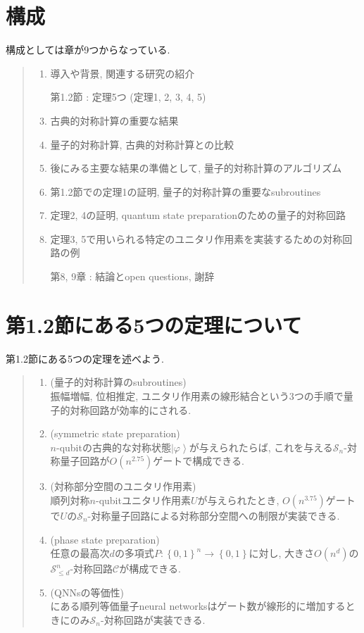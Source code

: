 \documentclass[12pt]{jsarticle}
\begin{document}
\section*{構成}
構成としては章が9つからなっている. 
\renewcommand{\theenumi}{\arabic{enumi}}
\renewcommand{\labelenumi}{第{\theenumi}章 :}
\begin{quote}
    \begin{enumerate}
        \item 導入や背景, 関連する研究の紹介
        \item[第1.2節 :] 定理5つ (定理1, 2, 3, 4, 5)
        \item 古典的対称計算の重要な結果
        \item 量子的対称計算, 古典的対称計算との比較
        \item 後にみる主要な結果の準備として, 量子的対称計算のアルゴリズム
        \item 第1.2節での定理1の証明, 量子的対称計算の重要なsubroutines
        \item 定理2, 4の証明, quantum state preparationのための量子的対称回路
        \item 定理3, 5で用いられる特定のユニタリ作用素を実装するための対称回路の例
        \item[第8, 9章 :] 結論とopen questions, 謝辞
    \end{enumerate}
\end{quote}
\section*{第1.2節にある5つの定理について}
第1.2節にある5つの定理を述べよう. 
\renewcommand{\theenumi}{\arabic{enumi}}
\renewcommand{\labelenumi}{定理{\theenumi}}
\begin{quote}
    \begin{enumerate}
        \item (量子的対称計算のsubroutines)\\
        振幅増幅, 位相推定, ユニタリ作用素の線形結合という3つの手順で量子的対称回路が効率的にされる. 
        \item (symmetric state preparation)\\
        $n$-qubitの古典的な対称状態$\left| \varphi \right\rangle $が与えられたらば, これを与える$\mathcal{S}_{n} $-対称量子回路が$O \left( n^{2.75} \right) $ゲートで構成できる. 
        \item (対称部分空間のユニタリ作用素)\\
        順列対称$n$-qubitユニタリ作用素$U$が与えられたとき, $O \left( n^{3.75} \right) $ゲートで$U$の$\mathcal{S}_{n} $-対称量子回路による対称部分空間への制限が実装できる. 
        \item (phase state preparation)\\
        任意の最高次$d$の多項式$P : \left\{ 0, 1 \right\}^{n} \to \left\{ 0, 1 \right\} $に対し, 大きさ$O \left( n^{d} \right) $の$\mathcal{S}^{n}_{\leq d} $-対称回路$\mathcal{C} $が構成できる. 
        \item (QNNsの等価性)\\
        \cite{3}にある順列等価量子neural networksはゲート数が線形的に増加するときにのみ$\mathcal{S}_{n} $-対称回路が実装できる.
    \end{enumerate}
\end{quote}
\end{document}
